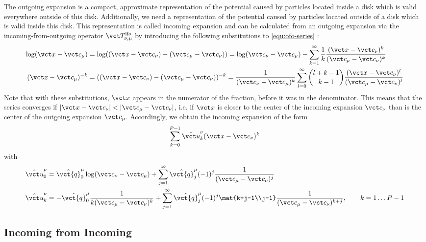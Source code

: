 The outgoing expansion is a compact, approximate representation of the potential caused by particles located inside a disk which is valid everywhere outside of this disk.
Additionally, we need a representation of the potential caused by particles located outside of a disk which is valid inside this disk.
This representation is called incoming expansion and can be calculated from an outgoing expansion via the incoming-from-outgoing operator $\vct T_{\nu, \mu}^\mathrm{ifo}$ by introducing the following substitutions to \cref{equ:ofo-series} \cite{short-course, Martinsson2015}:
\begin{align}
  \log(\vct x - \vct c_\mu)
    &= \log((\vct x - \vct c_\nu) - (\vct c_\mu - \vct c_\nu))
     = \log(\vct c_\nu - \vct c_\mu) - \sum_{k=1}^\infty \frac 1k \frac{(\vct x - \vct c_\nu)^k}{(\vct c_\mu - \vct c_\nu)^k} \\
  (\vct x - \vct c_\mu)^{-k}
    &= ((\vct x - \vct c_\nu) - (\vct c_\mu - \vct c_\nu))^{-k}
     = \frac 1{(\vct c_\nu - \vct c_\mu)^k} \sum_{l=0}^\infty \binom{l+k-1}{k-1} \frac{(\vct x - \vct c_\nu)^l}{(\vct c_\mu - \vct c_\nu)^l}
\end{align}
Note that with these substitutions, $\vct x$ appears in the numerator of the fraction, before it was in the denominator.
This means that the series converges if $|\vct x - \vct c_\nu| < |\vct c_\mu - \vct c_\nu|$, i.e. if $\vct x$ is closer to the center of the incoming expansion $\vct c_\nu$ than is the center of the outgoing expansion $\vct c_\mu$.
Accordingly, we obtain the incoming expansion of the form \cite{short-course, Martinsson2015}
\begin{equation}
  \sum_{k=0}^{P-1} \hat{\vct u}_k^\nu (\vct x - \vct c_\nu)^k
  \label{equ:incoming}
\end{equation}
with
\begin{equation}
  \begin{split}
    \hat{\vct u}_0^\nu &= \hat{\vct{q}}_0^\mu \log(\vct c_\nu - \vct c_\mu) + \sum_{j=1}^\infty \hat{\vct{q}}_j^\mu (-1)^j \frac 1 {(\vct c_\mu - \vct c_\nu)^j} \\
    \hat{\vct u}_k^\nu &= -\hat{\vct{q}}_0^\mu \frac 1 {k(\vct c_\mu - \vct c_\nu)^k} + \sum_{j=1}^\infty \hat{\vct{q}}_j^\mu (-1)^j \mat{k+j-1\\j-1} \frac 1 {(\vct c_\mu - \vct c_\nu)^{k+j}}, \qquad k = 1 \dots P-1
  \end{split}
\end{equation}

\subsection{Incoming from Incoming}

